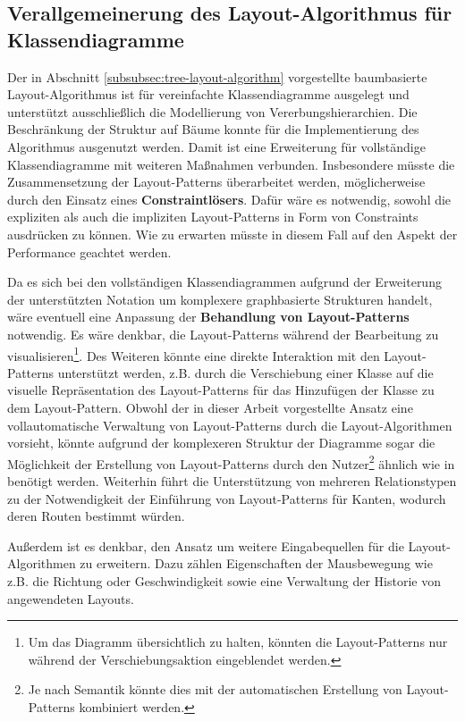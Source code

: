 \subsection{Verallgemeinerung des Layout-Algorithmus für Klassendiagramme}
\label{subsec:generalization-for-class-diagrams}

Der in Abschnitt \ref{subsubsec:tree-layout-algorithm} vorgestellte baumbasierte Layout-Algorithmus ist für vereinfachte Klassendiagramme ausgelegt und unterstützt ausschließlich die Modellierung von Vererbungshierarchien. Die Beschränkung der Struktur auf Bäume konnte für die Implementierung des Algorithmus ausgenutzt werden. Damit ist eine Erweiterung für vollständige Klassendiagramme mit weiteren Maßnahmen verbunden. Insbesondere müsste die Zusammensetzung der Layout-Patterns überarbeitet werden, möglicherweise durch den Einsatz eines \textbf{Constraintlösers}. Dafür wäre es notwendig, sowohl die expliziten als auch die impliziten Layout-Patterns in Form von Constraints ausdrücken zu können. Wie zu erwarten müsste in diesem Fall auf den Aspekt der Performance geachtet werden.

Da es sich bei den vollständigen Klassendiagrammen aufgrund der Erweiterung der unterstützten Notation um komplexere graphbasierte Strukturen handelt, wäre eventuell eine Anpassung der \textbf{Behandlung von Layout-Patterns} notwendig. Es wäre denkbar, die Layout-Patterns während der Bearbeitung zu visualisieren\footnote{Um das Diagramm übersichtlich zu halten, könnten die Layout-Patterns nur während der Verschiebungsaktion eingeblendet werden.}. Des Weiteren könnte eine direkte Interaktion mit den Layout-Patterns unterstützt werden, z.B. durch die Verschiebung einer Klasse auf die visuelle Repräsentation des Layout-Patterns für das Hinzufügen der Klasse zu dem Layout-Pattern. Obwohl der in dieser Arbeit vorgestellte Ansatz eine vollautomatische Verwaltung von Layout-Patterns durch die Layout-Algorithmen vorsieht, könnte aufgrund der komplexeren Struktur der Diagramme sogar die Möglichkeit der Erstellung von Layout-Patterns durch den Nutzer\footnote{Je nach Semantik könnte dies mit der automatischen Erstellung von Layout-Patterns kombiniert werden.} ähnlich wie in \cite{Maier12A-Pattern-based} benötigt werden. Weiterhin führt die Unterstützung von mehreren Relationstypen zu der Notwendigkeit der Einführung von Layout-Patterns für Kanten, wodurch deren Routen bestimmt würden.

Außerdem ist es denkbar, den Ansatz um weitere Eingabequellen für die Layout-Algorithmen zu erweitern. Dazu zählen Eigenschaften der Mausbewegung wie z.B. die Richtung oder Geschwindigkeit sowie eine Verwaltung der Historie von angewendeten Layouts.
